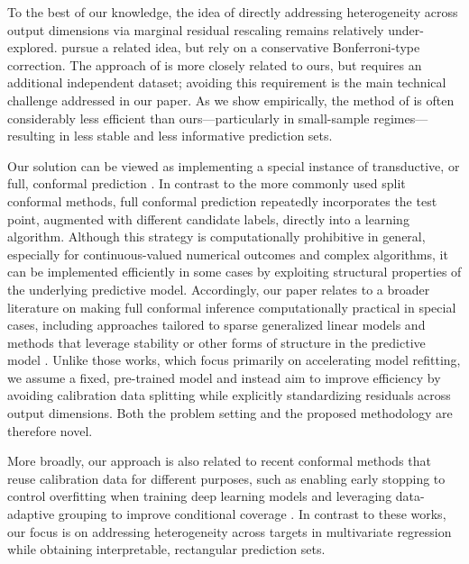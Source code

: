 To the best of our knowledge, the idea of directly addressing heterogeneity across output dimensions via marginal residual rescaling remains relatively under-explored. \citet{baheri2025multiscale} pursue a related idea, but rely on a conservative Bonferroni-type correction. The approach of \citet{sampson2024conformal} is more closely related to ours, but requires an additional independent dataset; avoiding this requirement is the main technical challenge addressed in our paper. As we show empirically, the method of \citet{baheri2025multiscale} is often considerably less efficient than ours—particularly in small-sample regimes—resulting in less stable and less informative prediction sets.

Our solution can be viewed as implementing a special instance of transductive, or full, conformal prediction \citep{vovk2005algorithmic,vovk2013transductive}. In contrast to the more commonly used split conformal methods, full conformal prediction repeatedly incorporates the test point, augmented with different candidate labels, directly into a learning algorithm. Although this strategy is computationally prohibitive in general, especially for continuous-valued numerical outcomes and complex algorithms, it can be implemented efficiently in some cases by exploiting structural properties of the underlying predictive model. Accordingly, our paper relates to a broader literature on making full conformal inference computationally practical in special cases, including approaches tailored to sparse generalized linear models \citep{lei2019fast,guha2023conformalization} and methods that leverage stability or other forms of structure in the predictive model \citep{ndiaye2019computing, abad2022approximating, martinez2023approximating, li2024generalized}. Unlike those works, which focus primarily on accelerating model refitting, we assume a fixed, pre-trained model and instead aim to improve efficiency by avoiding calibration data splitting while explicitly standardizing residuals across output dimensions. Both the problem setting and the proposed methodology are therefore novel.

More broadly, our approach is also related to recent conformal methods that reuse calibration data for different purposes, such as enabling early stopping to control overfitting when training deep learning models \citep{liang2023conformal} and leveraging data-adaptive grouping to improve conditional coverage \citep{zhou2024conformal, zhang2024posterior}. In contrast to these works, our focus is on addressing heterogeneity across targets in multivariate regression while obtaining interpretable, rectangular prediction sets.


